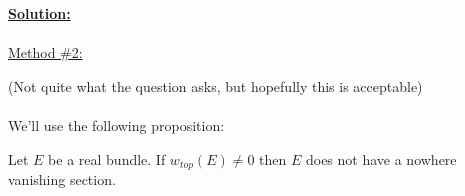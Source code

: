 \documentclass[11pt]{article}
\begin{document}
\vskip 0.5cm
\textbf{\underline{Solution:}}
\\
\\







\underline{Method \#2:}

(Not quite what the question asks, but hopefully this is acceptable)
\\
\\
We'll use the following proposition:

\begin{dottedbox}
  Let $E$ be a real bundle. If $w_{top}(E) \neq 0$ then $E$ does not have a nowhere vanishing section.
\end{dottedbox}
\end{document}
